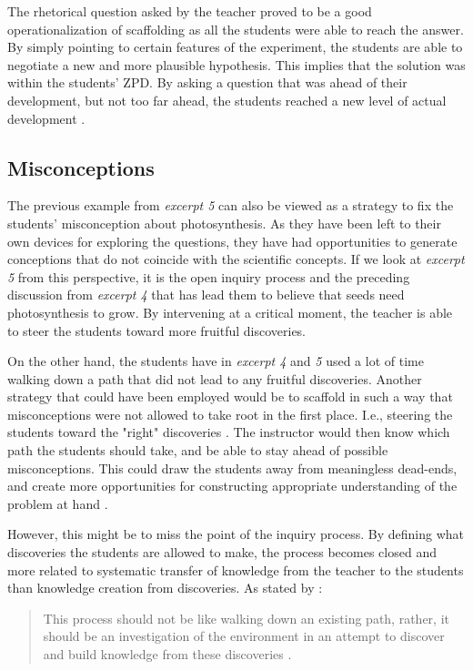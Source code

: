 The rhetorical question asked by the teacher proved to be a good operationalization of scaffolding as all the students were able to reach the answer. By simply pointing to certain features of the experiment, the students are able to negotiate a new and more plausible hypothesis. This implies that the solution was within the students' ZPD. By asking a question that was ahead of their development, but not too far ahead, the students reached a new level of actual development  \citep{vygotskiui1978mind}.

\subsection{Misconceptions}
The previous example from \emph{excerpt 5} can also be viewed as a strategy to fix the students' misconception about photosynthesis. As they have been left to their own devices for exploring the questions, they have had opportunities to generate conceptions that do not coincide with the scientific concepts. If we look at \emph{excerpt 5} from this perspective, it is the open inquiry process and the preceding discussion from \emph{excerpt 4} that has lead them to believe that seeds need photosynthesis to grow. By intervening at a critical moment, the teacher is able to steer the students toward more fruitful discoveries. 

On the other hand, the students have in \emph{excerpt 4} and \emph{5} used a lot of time walking down a path that did not lead to any fruitful discoveries. Another strategy that could have been employed would be to scaffold in such a way that misconceptions were not allowed to take root in the first place. I.e., steering the students toward the "right" discoveries \citep{kluge2010simulation}. The instructor would then know which path the students should take, and be able to stay ahead of possible misconceptions. This could draw the students away from meaningless dead-ends, and create more opportunities for constructing appropriate understanding of the problem at hand \citep{kluge2010simulation}.

However, this might be to miss the point of the inquiry process. By defining what discoveries the students are allowed to make, the process becomes closed and more related to systematic transfer of knowledge from the teacher to the students than knowledge creation from discoveries. As stated by \citeauthor{de1998scientific}: \begin{quote}This process should not be like walking down an existing path, rather, it should be an investigation of the environment in an attempt to discover and build knowledge from these discoveries \citetext{\citealp{de1998scientific}, referenced in \citealp{kluge2010simulation}}.
\end{quote}

